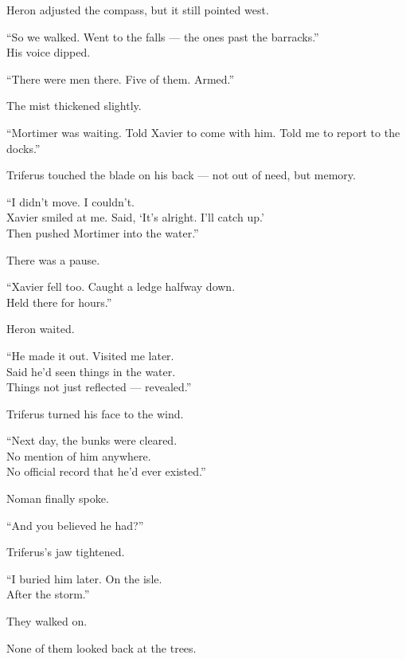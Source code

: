 \documentclass[12pt]{article}
\begin{document}
Heron adjusted the compass, but it still pointed west.

“So we walked. Went to the falls — the ones past the barracks.”\\
His voice dipped.

“There were men there. Five of them. Armed.”

\vspace{1em}

The mist thickened slightly.

“Mortimer was waiting. Told Xavier to come with him. Told me to report to the docks.”

Triferus touched the blade on his back — not out of need, but memory.

“I didn’t move. I couldn’t.\\
Xavier smiled at me. Said, ‘It’s alright. I’ll catch up.’\\
Then pushed Mortimer into the water.”

\vspace{1em}

There was a pause.

“Xavier fell too. Caught a ledge halfway down.\\
Held there for hours.”

Heron waited.

“He made it out. Visited me later.\\
Said he’d seen things in the water.\\
Things not just reflected — revealed.”

\vspace{1em}

Triferus turned his face to the wind.

“Next day, the bunks were cleared.\\
No mention of him anywhere.\\
No official record that he’d ever existed.”

\vspace{1em}

Noman finally spoke.

“And you believed he had?”

Triferus’s jaw tightened.

“I buried him later. On the isle.\\
After the storm.”

\vspace{1em}

They walked on.

None of them looked back at the trees.
\end{document}
